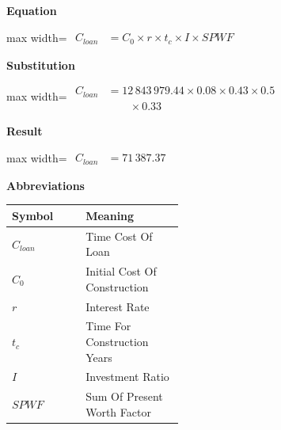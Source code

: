\documentclass{article}
\begin{document}
\vspace{0.4em}
\textbf{Equation}\par\vspace{-0.35em}
\begin{center}
\begin{adjustbox}{max width=\linewidth}
$\displaystyle\begin{aligned}
C_{loan} &= C_0 \times r \times t_c \times I \times SPWF
\end{aligned}$
\end{adjustbox}
\end{center}
\vspace{0.4em}
\textbf{Substitution}\par\vspace{-0.35em}
\begin{center}
\begin{adjustbox}{max width=\linewidth}
$\displaystyle\begin{aligned}
C_{loan} &= 12\,843\,979.44 \times 0.08 \times 0.43 \times 0.5 \\
&\qquad \times 0.33
\end{aligned}$
\end{adjustbox}
\end{center}
\vspace{0.4em}
\textbf{Result}\par\vspace{-0.35em}
\begin{center}
\begin{adjustbox}{max width=\linewidth}
$\displaystyle\begin{aligned}
C_{loan} &= 71\,387.37
\end{aligned}$
\end{adjustbox}
\end{center}
\vspace{0.4em}
\textbf{Abbreviations}\par\vspace{-0.35em}
\begin{tabularx}{\linewidth}{>{\raggedright\arraybackslash}p{0.43\linewidth} >{\raggedright\arraybackslash}X}
\toprule
Symbol & Meaning \\
\midrule
$C_{loan}$ & Time Cost Of Loan \\
$C_0$ & Initial Cost Of Construction \\
$r$ & Interest Rate \\
$t_c$ & Time For Construction Years \\
$I$ & Investment Ratio \\
$SPWF$ & Sum Of Present Worth Factor \\
\bottomrule
\end{tabularx}
\end{document}
